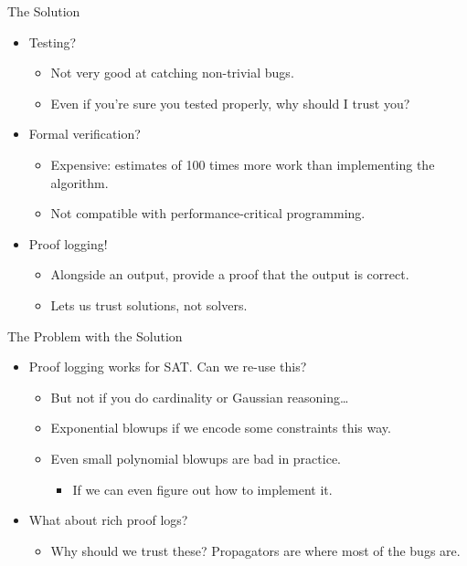 \documentclass{beamer}
\begin{document}
\begin{frame}{The Solution}
    \begin{itemize}
        \item Testing?
            \begin{itemize}
                \item Not very good at catching non-trivial bugs.
                \item Even if you're sure you tested properly, why should I trust you?
            \end{itemize}
        \item Formal verification?
            \begin{itemize}
                \item Expensive: estimates of 100 times more work than implementing the algorithm.
                \item Not compatible with performance-critical programming.
            \end{itemize}
        \item Proof logging!
            \begin{itemize}
                \item Alongside an output, provide a proof that the output is correct.
                \item Lets us \textcolor{uofgcobalt}{trust solutions}, not solvers.
            \end{itemize}
    \end{itemize}
\end{frame}

\begin{frame}{The Problem with the Solution}
    \begin{itemize}
        \item Proof logging works for SAT. Can we re-use this?
            \begin{itemize}
                \item But not if you do cardinality or Gaussian reasoning\ldots
                \item Exponential blowups if we encode some constraints this way.
                \item Even small polynomial blowups are bad in practice.
                    \begin{itemize}
                        \item If we can even figure out how to implement it.
                    \end{itemize}
            \end{itemize}
        \item What about rich proof logs?
            \begin{itemize}
                \item Why should we trust these? Propagators are where most of the bugs are.
            \end{itemize}
    \end{itemize}
\end{frame}
\end{document}
